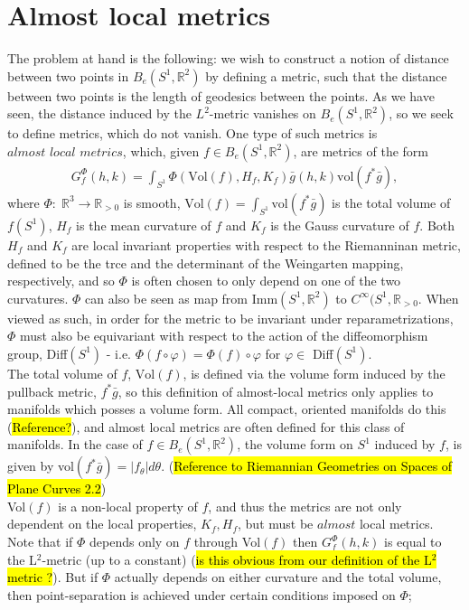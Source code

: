 \documentclass[a4,danish]{article}
\theoremstyle{break}
\theoremstyle{definition}
\theoremstyle{Break}
\newcommand{\R}{\mathbb{R}}
\renewcommand{\phi}{\varphi}
\begin{document}

\section*{Almost local metrics}
\label{sec:al-metrics}

The problem at hand is the following: we wish to construct a notion of distance between two points in $B_e(S^1,\R^2)$ by defining a metric, such that the distance between two points is the length of geodesics between the points. As we have seen, the distance induced by the $L^2$-metric vanishes on $B_e(S^1, \R^2)$, so we seek to define metrics, which do not vanish. One type of such metrics is $\textit{almost local metrics}$, which, given $f \in B_e(S^1, \R^2)$, are metrics of the form
\begin{align*}
G_f^\Phi (h,k) = \int_{S^1} \Phi(\text{Vol}(f), H_f, K_f) \bar{g}(h,k) \text{vol}(f^* \bar{g}),
\end{align*}
where $\Phi: \; \R^3 \rightarrow \R_{> 0}$ is smooth, $\text{Vol}(f) = \int_{S^1} \text{vol}(f^* \bar{g})$ is the total volume of $f(S^1)$, $H_f$ is the mean curvature of $f$ and $K_f$ is the Gauss curvature of $f$. Both $H_f$ and $K_f$ are local invariant properties with respect to the Riemanninan metric, defined to be the trce and the determinant of the Weingarten mapping, respectively, and so $\Phi$ is often chosen to only depend on one of the two curvatures. $\Phi$ can also be seen as map from Imm$(S^1, \R^2)$ to $C^\infty (S^1, \R_{> 0}$. When viewed as such, in order for the metric to be invariant under reparametrizations, $\Phi$ must also be equivariant with respect to the action of the diffeomorphism group, Diff$(S^1)$ - i.e. $\Phi(f \circ \phi) = \Phi(f) \circ \phi$ for $\phi \in$ Diff$(S^1)$. \\[0.2 cm]
The total volume of $f$, $\text{Vol}(f)$, is defined via the volume form induced by the pullback metric, $f^*\bar{g}$, so this definition of almost-local metrics only applies to manifolds which posses a volume form. All compact, oriented manifolds do this (\hl{Reference?}), and almost local metrics are often defined for this class of manifolds. In the case of $f \in B_e(S^1, \R^2)$, the volume form on $S^1$ induced by $f$, is given by vol$(f^*\bar{g}) = \left| f_\theta \right| d \theta$. (\hl{Reference to Riemannian Geometries on Spaces of Plane Curves 2.2}) \\[0.2 cm] 
Vol$(f)$ is a non-local property of $f$, and thus the metrics are not only dependent on the local properties, $K_f, H_f$, but must be $\textit{almost}$ local metrics. \\[0.2 cm]
Note that if $\Phi$ depends only on $f$ through Vol$(f)$ then $G_f^\Phi (h,k)$ is equal to the L$^2$-metric (up to a constant) (\hl{is this obvious from our definition of the L$^2$ metric ?}). But if $\Phi$ actually depends on either curvature and the total volume, then point-separation is achieved under certain conditions imposed on $\Phi$;
\end{document}
